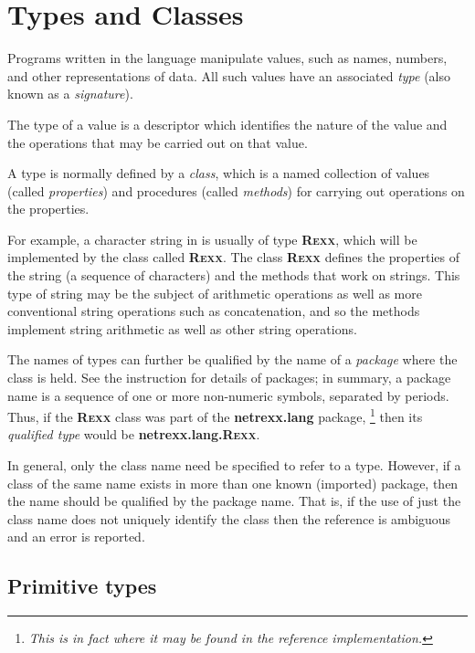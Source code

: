 \section{Types and Classes}\label{reftypes}
\index{,}
 
Programs written in the \nr{} language manipulate values, such as
names, numbers, and other representations of data.
All such values have an associated \emph{type} (also known as a
\emph{signature}).
 
The type of a value is a descriptor which identifies the nature of the
value and the operations that may be carried out on that value.
 
A type is normally defined by a \emph{class}, which is a named
collection of values (called \emph{properties}) and procedures (called
\emph{methods}) for carrying out operations on the properties.
 
For example, a character string in \nr{} is usually of
type \textbf{R\textsc{exx}}, which will be implemented by the class
called \textbf{R\textsc{exx}}.
The class \textbf{R\textsc{exx}} defines the properties of the string (a
sequence of characters) and the methods that work on strings.
This type of string may be the subject of arithmetic operations as well
as more conventional string operations such as concatenation, and so the
methods implement string arithmetic as well as other string operations.
 
The names of types can further be qualified by the name of a
\emph{package} where the class is held.  See the 
instruction for details of packages; in summary, a package name is a
sequence of one or more non-numeric symbols, separated by periods.
Thus, if the \textbf{R\textsc{exx}} class was part of
the \textbf{netrexx.lang} package,
\footnote{
\emph{This is in fact where it may be found in the reference
implementation.}
}
then its \emph{qualified type} would be \textbf{netrexx.lang.R\textsc{exx}}.
 
In general, only the class name need be specified to refer to a type.
However, if a class of the same name exists in more than one known
(imported) package, then the name should be qualified by the package
name.  That is, if the use of just the class name does not uniquely
identify the class then the reference is ambiguous and an error is
reported.
\subsection{Primitive types}\label{refprims}
 
